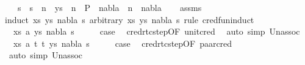 \begin{isabellebody}
\ \ \ {\isachardoublequoteopen}s{\isacharprime}{\kern0pt}\ {\isacharequal}{\kern0pt}\ s\ {\isasymand}\ {\isacharparenleft}{\kern0pt}{\isasymexists}n{}{\isachardot}{\kern0pt}\ {\isacharparenleft}{\kern0pt}{\isacharbrackleft}{\kern0pt}{\isacharbrackright}{\kern0pt}{\isacharcomma}{\kern0pt}\ ys{\isacharparenright}{\kern0pt}\ {\isasymturnstile}\ n{}\ {\isasymrightarrow}\isactrlsup {\isacharasterisk}{\kern0pt}\ P{\isacharprime}{\kern0pt}\ {\isasymand}\ nabla{\isacharprime}{\kern0pt}\ {\isacharequal}{\kern0pt}\ n{}\ {\isasymunion}\ nabla{\isacharparenright}{\kern0pt}{\isachardoublequoteclose}\isanewline
%
\isadelimproof
\ \ %
\endisadelimproof
%
\isatagproof
{}\isamarkupfalse%
\ assms\isanewline
{}\isamarkupfalse%
{\isacharparenleft}{\kern0pt}induct\ {\isachardoublequoteopen}{\isacharparenleft}{\kern0pt}{\isacharparenleft}{\kern0pt}xs{\isacharcomma}{\kern0pt}\ ys{\isacharparenright}{\kern0pt}{\isacharcomma}{\kern0pt}\ nabla{\isacharcomma}{\kern0pt}\ s{\isacharparenright}{\kern0pt}{\isachardoublequoteclose}\ arbitrary{\isacharcolon}{\kern0pt}\ xs\ ys\ nabla\ s\ rule{\isacharcolon}{\kern0pt}\ cred{\isacharunderscore}{\kern0pt}fun{\isachardot}{\kern0pt}induct{\isacharparenright}{\kern0pt}\isanewline
\ \ \isamarkupfalse%
\ {\isacharparenleft}{\kern0pt}{}\ xs\ a\ ys\ nabla\ s{\isacharparenright}{\kern0pt}\isanewline
\ \ \isamarkupfalse%
\ \isamarkupfalse%
\ {\isacharquery}{\kern0pt}case\ \isamarkupfalse%
\ cred{\isacharunderscore}{\kern0pt}rtc{\isacharunderscore}{\kern0pt}step{\isacharbrackleft}{\kern0pt}OF\ unit{\isacharunderscore}{\kern0pt}cred{\isacharbrackright}{\kern0pt}\ \isamarkupfalse%
\ {\isacharparenleft}{\kern0pt}auto\ simp{\isacharcolon}{\kern0pt}\ Un{\isacharunderscore}{\kern0pt}assoc{\isacharparenright}{\kern0pt}\isanewline
{}\isamarkupfalse%
\isanewline
\ \ \isamarkupfalse%
\ {\isacharparenleft}{\kern0pt}{}\ xs\ a\ t{}\ t{}\ ys\ nabla\ s{\isacharparenright}{\kern0pt}\isanewline
\ \ \isamarkupfalse%
\ \isamarkupfalse%
\ {\isacharquery}{\kern0pt}case\ \isamarkupfalse%
\ cred{\isacharunderscore}{\kern0pt}rtc{\isacharunderscore}{\kern0pt}step{\isacharbrackleft}{\kern0pt}OF\ paar{\isacharunderscore}{\kern0pt}cred{\isacharbrackright}{\kern0pt}\ \isamarkupfalse%
\ {\isacharparenleft}{\kern0pt}auto\ simp{\isacharcolon}{\kern0pt}\ Un{\isacharunderscore}{\kern0pt}assoc{\isacharparenright}{\kern0pt}\isanewline

\end{isabellebody}
